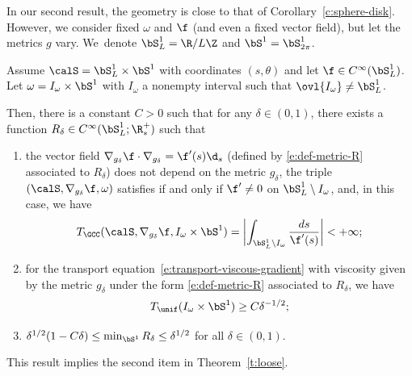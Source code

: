 In our second result, the geometry is close to that of Corollary~\ref{c:sphere-disk}. However, we consider fixed $\omega$ and $\f$ (and even a fixed vector field), but let the metrics $g$ vary.
We~denote $\bS^1_L = \R/L\Z$ and $\bS^1 =\bS^1_{2\pi}$.
\begin{corollary}
\label{c:example-torus}
Assume $\calS=\bS^1_L \times \bS^1$ with coordinates $(s,\theta)$ and let $\f\in C^{\infty}(\bS^1_L)$.
Let $\omega = I_\omega \times \bS^1$ with $I_\omega$ a nonempty interval such that $\ovl{I_\omega} \neq \bS^1_L$.

Then, there is a constant $C>0$ such that for any $\delta \in (0,1)$, there exists a function $R_\delta \in C^\infty(\bS^1_L ;\R^+_*)$ such that
\begin{enumerate}
\item the vector field $\nabla_{g_\delta}\f \cdot \nabla_{g_\delta}= \f'(s) \d_s$ (defined by \eqref{e:def-metric-R} associated to $R_\delta$) does not depend on the metric $g_\delta$, the triple $(\calS,\nabla_{g_\delta}\f,\omega)$ satisfies \pGCC if and only if $\f'\neq 0$ on $\bS^1_L \setminus I_\omega$, and, in this case, we have\vspace*{-3pt}
\[
T_{\GCC}(\calS, \nabla_{g_\delta}\f,I_\omega \times \bS^1) = \biggl| \int_{\bS^1_L \setminus I_\omega} \frac{ds}{\f'(s)} \biggr| < +\infty;
\]
\item for the transport equation~\eqref{e:transport-viscous-gradient} with viscosity given by the metric $g_\delta$ under the form \eqref{e:def-metric-R} associated to $R_\delta$, we have\vspace*{-3pt}
\[
T_{\unif}(I_\omega \times\bS^1) \geq C\delta^{-1/2};
\]
\item $\delta^{1/2} (1-C\delta) \leq \min_{\bS^1}R_\delta \leq \delta^{1/2}$ for all $\delta \in (0,1)$.
\end{enumerate}
\end{corollary}
This result implies the second item in Theorem~\ref{t:loose}.

